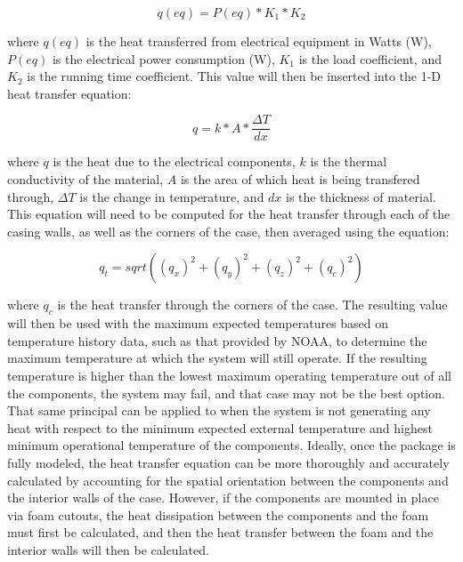 \begin{equation}
q(eq) = P(eq)*K_1*K_2
\end{equation}

where $q(eq)$ is the heat transferred from electrical equipment in Watts (W), $P(eq)$ is the electrical power consumption (W), $K_1$ is the load
coefficient, and $K_2$ is the running time coefficient. This value will then be inserted into the 1-D heat transfer equation:

\begin{equation}
q=k*A*\frac{\Delta T}{dx}
\end{equation}

where $q$ is the heat due to the electrical components, $k$ is the thermal conductivity of the material, $A$ is the area of which heat is being transfered
through, $\Delta T$ is the change in temperature, and $dx$ is the thickness of material. This equation will need to be computed for the heat transfer
through each of the casing walls, as well as the corners of the case, then averaged using the equation: 

$$q_t = sqrt((q_x)^2+(q_y)^2+(q_z)^2+(q_c)^2)$$

where $q_c$ is the heat transfer through the corners of the case. The resulting value will then be used with the maximum expected temperatures based on
temperature history data, such as that provided by NOAA, to determine the maximum temperature at which the system will still operate. If the resulting
temperature is higher than the lowest maximum operating temperature out of all the components, the system may fail, and that case may not be the best
option. That same principal can be applied to when the system is not generating any heat with respect to the minimum expected external temperature and
highest minimum operational temperature of the components. Ideally, once the package is fully modeled, the heat transfer equation can be more
thoroughly and accurately calculated by accounting for the spatial orientation between the components and the interior walls of the case. However,
if the components are mounted in place via foam cutouts, the heat dissipation between the components and the foam must first be calculated, and then
the heat transfer between the foam and the interior walls will then be calculated.

